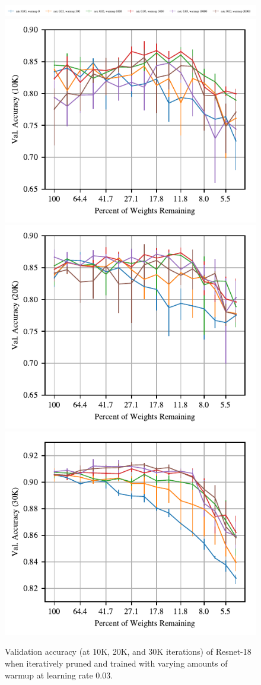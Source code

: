 \begin{figure}
\centering
\vspace{-.5em}
\includegraphics[width=\textwidth]{graphs/cifar10/icml/resnet18-iclr-warmupsweep-10000/legend}
\includegraphics[width=.33\textwidth]{graphs/cifar10/icml/resnet18-iclr-warmupsweep-10000/accuracy}%
\includegraphics[width=.33\textwidth]{graphs/cifar10/icml/resnet18-iclr-warmupsweep-20000/accuracy}%
\includegraphics[width=.33\textwidth]{graphs/cifar10/icml/resnet18-iclr-warmupsweep-29900/accuracy}%
\vspace{-1em}
\caption{Validation accuracy (at 10K, 20K, and 30K iterations) of Resnet-18 when iteratively pruned and trained with varying amounts of warmup at learning rate 0.03.}
\label{fig:resnet18-warmup}
\end{figure}

